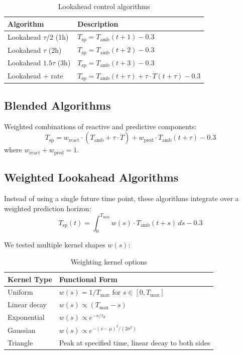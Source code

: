 \documentclass[11pt,letterpaper]{article}
\begin{document}
\begin{table}[H]
\centering
\caption{Lookahead control algorithms}
\begin{tabular}{lp{8cm}}
\toprule
\textbf{Algorithm} & \textbf{Description} \\
\midrule
Lookahead $\tau/2$ (1h) & $T_{\text{sp}} = T_{\text{amb}}(t+1) - 0.3$ \\
Lookahead $\tau$ (2h) & $T_{\text{sp}} = T_{\text{amb}}(t+2) - 0.3$ \\
Lookahead $1.5\tau$ (3h) & $T_{\text{sp}} = T_{\text{amb}}(t+3) - 0.3$ \\
Lookahead + rate & $T_{\text{sp}} = T_{\text{amb}}(t+\tau) + \tau \cdot \dot{T}(t+\tau) - 0.3$ \\
\bottomrule
\end{tabular}
\end{table}

\subsection{Blended Algorithms}

Weighted combinations of reactive and predictive components:
\begin{equation}
T_{\text{sp}} = w_{\text{react}} \cdot \left(T_{\text{amb}} + \tau \cdot \dot{T}\right) + w_{\text{pred}} \cdot T_{\text{amb}}(t+\tau) - 0.3
\end{equation}
where $w_{\text{react}} + w_{\text{pred}} = 1$.

\subsection{Weighted Lookahead Algorithms}

Instead of using a single future time point, these algorithms integrate over a weighted prediction horizon:
\begin{equation}
T_{\text{sp}}(t) = \int_0^{T_{\max}} w(s) \cdot T_{\text{amb}}(t+s)\,ds - 0.3
\label{eq:weighted}
\end{equation}

We tested multiple kernel shapes $w(s)$:

\begin{table}[H]
\centering
\caption{Weighting kernel options}
\begin{tabular}{ll}
\toprule
\textbf{Kernel Type} & \textbf{Functional Form} \\
\midrule
Uniform & $w(s) = 1/T_{\max}$ for $s \in [0, T_{\max}]$ \\
Linear decay & $w(s) \propto (T_{\max} - s)$ \\
Exponential & $w(s) \propto e^{-s/\tau_d}$ \\
Gaussian & $w(s) \propto e^{-(s-\mu)^2/(2\sigma^2)}$ \\
Triangle & Peak at specified time, linear decay to both sides \\
\bottomrule
\end{tabular}
\end{table}
\end{document}
